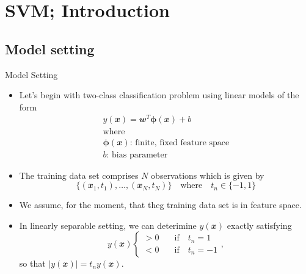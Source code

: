 \documentclass{bredelebeamer}
\begin{document}
\section{SVM; Introduction}
\subsection{Model setting}
\begin{frame}{Model Setting}
  \begin{itemize}
    \item Let's begin with two-class classification problem using linear models of the form
    \begin{equation}
      \begin{gathered}
        y(\mathbfit{x}) = \mathbfit{w}^T \boldsymbol{\phi} (\mathbfit{x}) + b \\
        \textrm{where} \\
        \boldsymbol{\phi} (\mathbfit{x})\textrm{: finite, fixed feature space} \\
        b\textrm{: bias parameter}
      \end{gathered}
    \end{equation}
    \item The training data set comprises $N$ observations which is given by
    \begin{equation}
      {\{ (\mathbfit{x}_1, t_1), \ldots, (\mathbfit{x}_N, t_N) \}}
      \quad \textrm{where} \quad t_n \in {\{-1, 1\}}
    \end{equation}
    \item We assume, for the moment, that theg training data set is  in feature space.
    \item In linearly separable setting, we can deterimine $y(\mathbfit{x})$
          exactly satisfying
    \begin{equation}
      y(\mathbfit{x}) \left\{
      \begin{array}{ll}
        > 0 \quad & \textrm{if} \quad t_n = 1 \\
        < 0 \quad & \textrm{if} \quad t_n = -1
      \end{array}
      \right.,
    \end{equation}
    so that $|y(\mathbfit{x})| = t_n y(\mathbfit{x})$.
  \end{itemize}
\end{frame}
\end{document}
